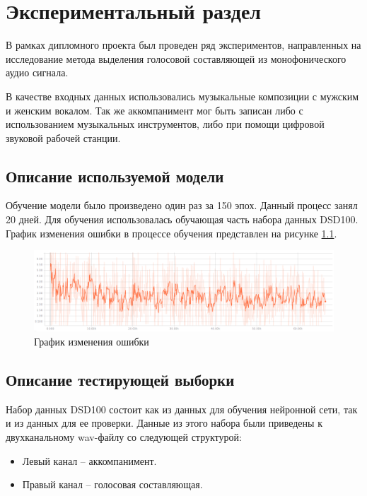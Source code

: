 \chapter{Экспериментальный раздел}
\label{cha:research}

В рамках дипломного проекта был проведен ряд экспериментов, направленных на исследование метода выделения голосовой составляющей из монофонического аудио сигнала. 

В качестве входных данных использовались музыкальные композиции с мужским и женским вокалом. Так же аккомпанимент мог быть записан либо с использованием музыкальных инструментов, либо при помощи цифровой звуковой рабочей станции.

\section{Описание используемой модели}

Обучение модели было произведено один раз за 150 эпох. Данный процесс занял 20 дней. Для обучения использовалась обучающая часть набора данных DSD100. График изменения ошибки в процессе обучения представлен на рисунке \ref{res:loss}.

\begin{figure}
	\centering
	\includegraphics[width=\textwidth]{inc/img/loss-dsd}
	\caption{График изменения ошибки}
	\label{res:loss}
\end{figure}

\section{Описание тестирующей выборки}

Набор данных DSD100 состоит как из данных для обучения нейронной сети, так и из данных для ее проверки.  Данные из этого набора были приведены к двухканальному wav-файлу со следующей структурой:

\begin{itemize}
	\item Левый канал -- аккомпанимент.
	\item Правый канал -- голосовая составляющая.
\end{itemize}

